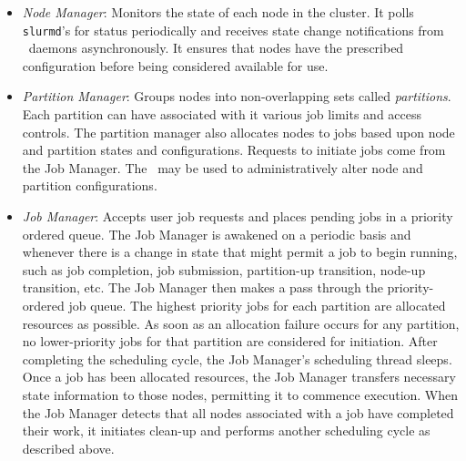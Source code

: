 \begin{itemize}
\item {\em Node Manager}: Monitors the state of each node in
the cluster.  It polls {\tt slurmd}'s for status periodically and
receives state change notifications from \slurmd\ daemons asynchronously.
It ensures that nodes have the prescribed configuration before being 
considered available for use.

\item {\em Partition Manager}: Groups nodes into non-overlapping sets called
{\em partitions}. Each partition can have associated with it various job
limits and access controls.  The partition manager also allocates nodes
to jobs based upon node and partition states and configurations. Requests
to initiate jobs come from the Job Manager.  The \scontrol\ may be used
to administratively alter node and partition configurations.

\item {\em Job Manager}: Accepts user job requests and places pending 
jobs in a priority ordered queue. 
The Job Manager is awakened on a periodic basis and whenever there
is a change in state that might permit a job to begin running, such
as job completion, job submission, partition-up transition,
node-up transition, etc.  The Job Manager then makes a pass
through the priority-ordered job queue. The highest priority jobs 
for each partition are allocated resources as possible. As soon as an 
allocation failure occurs for any partition, no lower-priority jobs for 
that partition are considered for initiation. 
After completing the scheduling cycle, the Job Manager's scheduling
thread sleeps.  Once a job has been allocated resources, the Job Manager
transfers necessary state information to those nodes, permitting it 
to commence execution.  When the Job Manager detects that
all nodes associated with a job have completed their work, it initiates
clean-up and performs another scheduling cycle as described above.

\end{itemize}

